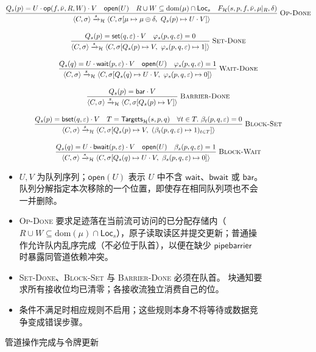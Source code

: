 \documentclass[UTF8,a4paper,11pt,fontset=fandol]{ctexart}
\newcommand{\kw}[1]{\ensuremath{\mathsf{#1}}}
\newcommand{\infer}[2]{\displaystyle\frac{\displaystyle #1}{\displaystyle #2}}
\begin{document}
\clearpage
\begin{figure}[!htbp]
\centering\small
\[
\begin{gathered}
\infer{Q_s(p)=U\cdot\kw{op}(f,\bar\nu,R,W)\cdot V\quad\mathsf{open}(U)
 \quad R\cup W\subseteq\mathrm{dom}(\mu)\cap\mathsf{Loc}_s
 \quad F_{\mathcal H}(s,p,f,\bar\nu,\mu|_R,\delta)}
 {\langle C,\sigma\rangle\xrightarrow{s}_{\mathcal H}
 \langle C,\sigma[\mu\mapsto\mu\oplus\delta,\ Q_s(p)\mapsto U\cdot V]\rangle}
 \;\textsc{Op-Done}\\[1em]
\infer{Q_s(p)=\kw{set}(q,\varepsilon)\cdot V\quad\varphi_s(p,q,\varepsilon)=0}
 {\langle C,\sigma\rangle\xrightarrow{s}_{\mathcal H}
 \langle C,\sigma[Q_s(p)\mapsto V,\ \varphi_s(p,q,\varepsilon)\mapsto1]\rangle}
 \;\textsc{Set-Done}\\[1em]
\infer{Q_s(q)=U\cdot\kw{wait}(p,\varepsilon)\cdot V\quad\mathsf{open}(U)
 \quad\varphi_s(p,q,\varepsilon)=1}
 {\langle C,\sigma\rangle\xrightarrow{s}_{\mathcal H}
 \langle C,\sigma[Q_s(q)\mapsto U\cdot V,\ \varphi_s(p,q,\varepsilon)\mapsto0]\rangle}
 \;\textsc{Wait-Done}\\[1em]
\infer{Q_s(p)=\kw{bar}\cdot V}
 {\langle C,\sigma\rangle\xrightarrow{s}_{\mathcal H}
 \langle C,\sigma[Q_s(p)\mapsto V]\rangle}
 \;\textsc{Barrier-Done}\\[1em]
\infer{Q_s(p)=\kw{bset}(q,\varepsilon)\cdot V\quad T=\mathsf{Targets}_{\mathcal H}(s,p,q)
 \quad\forall t\in T.\ \beta_t(p,q,\varepsilon)=0}
 {\langle C,\sigma\rangle\xrightarrow{s}_{\mathcal H}
 \langle C,\sigma[Q_s(p)\mapsto V,\ (\beta_t(p,q,\varepsilon)\mapsto1)_{t\in T}]\rangle}
 \;\textsc{Block-Set}\\[1em]
\infer{Q_s(q)=U\cdot\kw{bwait}(p,\varepsilon)\cdot V\quad\mathsf{open}(U)
 \quad\beta_s(p,q,\varepsilon)=1}
 {\langle C,\sigma\rangle\xrightarrow{s}_{\mathcal H}
 \langle C,\sigma[Q_s(q)\mapsto U\cdot V,\ \beta_s(p,q,\varepsilon)\mapsto0]\rangle}
 \;\textsc{Block-Wait}
\end{gathered}
\]
\caption{管道操作完成与令牌更新}
\begin{itemize}
\item $U,V$ 为队列序列；$\mathsf{open}(U)$ 表示 $U$ 中不含 \kw{wait}、\kw{bwait} 或 \kw{bar}。
队列分解指定本次移除的一个位置，即使存在相同队列项也不会一并删除。
\item \textsc{Op-Done} 要求足迹落在当前流可访问的已分配存储内（$R\cup W\subseteq\mathrm{dom}(\mu)\cap\mathsf{Loc}_s$），原子读取读区并提交更新；普通操作允许队内乱序完成（不必位于队首），以便在缺少 \kw{pipebarrier} 时暴露同管道依赖冲突。
\item \textsc{Set-Done}、\textsc{Block-Set} 与 \textsc{Barrier-Done} 必须在队首。
块通知要求所有接收位均已清零；各接收流独立消费自己的位。
\item 条件不满足时相应规则不启用；这些规则本身不将等待或数据竞争变成错误步骤。
\end{itemize}
\end{figure}
\end{document}
